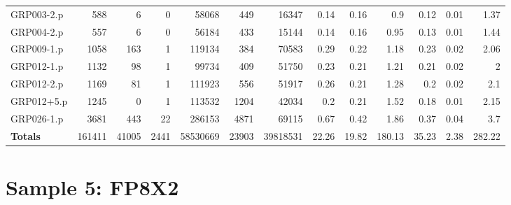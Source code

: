 \begin{table}[H]
\begin{adjustwidth}{-1.1in}{-0.5in}
\begin{tabular}{| l || r | r | r || r | r | r || r | r | r | r | r | r |}
GRP003-2.p&588&6&0&58068&449&16347&0.14&0.16&0.9&0.12&0.01&1.37\\
GRP004-2.p&557&6&0&56184&433&15144&0.14&0.16&0.95&0.13&0.01&1.44\\
GRP009-1.p&1058&163&1&119134&384&70583&0.29&0.22&1.18&0.23&0.02&2.06\\
GRP012-1.p&1132&98&1&99734&409&51750&0.23&0.21&1.21&0.21&0.02&2\\
GRP012-2.p&1169&81&1&111923&556&51917&0.26&0.21&1.28&0.2&0.02&2.1\\
GRP012+5.p&1245&0&1&113532&1204&42034&0.2&0.21&1.52&0.18&0.01&2.15\\
GRP026-1.p&3681&443&22&286153&4871&69115&0.67&0.42&1.86&0.37&0.04&3.7\\\hline \hline
\textbf{Totals}&161411&41005&2441&58530669&23903&39818531&22.26&19.82&180.13&35.23&2.38&282.22\\\hline
\end{tabular}\end{adjustwidth}\end{table}

\section{Sample 5: FP8X2}

